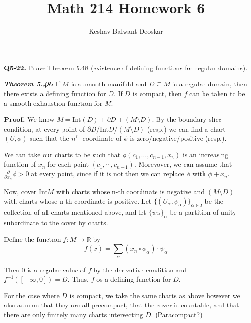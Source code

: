 \documentclass{article}
\title{Math 214 Homework 6}
\author{Keshav Balwant Deoskar}
\newcommand{\R}{\mathbb{R}}
\begin{document}
\maketitle



\textbf{Q5-22.} Prove Theorem 5.48 (existence of defining functions for regular domains).

\begin{dottedbox}
  \emph{\textbf{Theorem 5.48:}} If $M$ is a smooth manifold and $D \subseteq M$ is a regular domain, then there exists a defining function for $D$. If $D$ is compact, then $f$ can be taken to be a smooth exhaustion function for $M$.
\end{dottedbox}


\vskip 0.5cm
\textbf{Proof:}
We know $M = \text{Int}(D) + \partial D + (M \setminus D)$. By the boundary slice condition, at every point of $\partial D$/Int$D$/$(M \setminus D)$ (resp.) we can find a chart $(U, \phi)$ such that the $n^{\text{th}}$ coordinate of $\phi$ is zero/negative/positive (resp.).

\vskip 0.25cm
We can take our charts to be such that $\phi(c_1, \dots, c_{n-1}, x_n)$ is an increasing function of $x_n$ for each point $(c_1, \cdots, c_{n-1})$. Morevover, we can assume that $\frac{\partial}{\partial x_n} \phi > 0$ at every point, since if it is not then we can replace $\phi$ with $\phi + x_n$.

\vskip 0.5cm
Now, cover Int$M$ with charts whose n-th coordinate is negative and $(M \setminus D)$ with charts whose n-th coordinate is positive. Let $\{ (U_{\alpha}, \psi_{\alpha}) \}_{\alpha \in I}$ be the collection of all charts mentioned above, and let $\{\psi{\alpha}\}_{\alpha}$ be a partition of unity subordinate to the cover by charts.

\vskip 0.25cm
Define the function $f : M \rightarrow \R$ by 
\[ f(x) = \sum_{\alpha} \left(x_n \circ \phi_{\alpha}\right) \cdot \psi_{\alpha}  \]

Then $0$ is a regular value of $f$ by the derivative condition and $f^{-1}([-\infty, 0]) = D$. Thus, $f$ os a defining function for $D$.

\vskip 0.5cm
For the case where $D$ is compact, we take the same charts as above however we also assume that they are all precompact, that the cover is countable, and that there are only finitely many charts intersecting $D$. (Paracompact?) 
\end{document}
